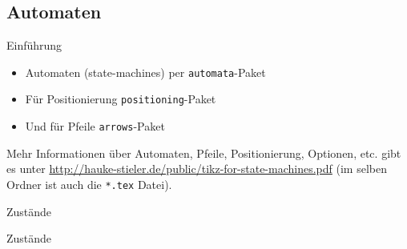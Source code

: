 \documentclass{beamer}
\begin{document}
		
		\subsection{Automaten}

		\begin{frame}[containsverbatim]{Einführung}
			\begin{itemize}
				\item Automaten (state-machines) per \texttt{automata}-Paket
				\item Für Positionierung \texttt{positioning}-Paket
				\item Und für Pfeile \texttt{arrows}-Paket
			\end{itemize}
			Mehr Informationen über Automaten, Pfeile, Positionierung, Optionen, etc. gibt es unter \href{http://hauke-stieler.de/public/tikz-for-state-machines.pdf}{http://hauke-stieler.de/public/tikz-for-state-machines.pdf} (im selben Ordner ist auch die \texttt{*.tex} Datei).
		\end{frame}


		\begin{frame}[containsverbatim]{Zustände}
			\begin{latexcode}
\usetikzlibrary{
	automata,
	arrows}
			\end{latexcode}
		\end{frame}


		\begin{frame}[containsverbatim]{Zustände}
			\begin{center}
				\vspace{0.5cm}
			\end{center}
		\end{frame}
\end{document}
